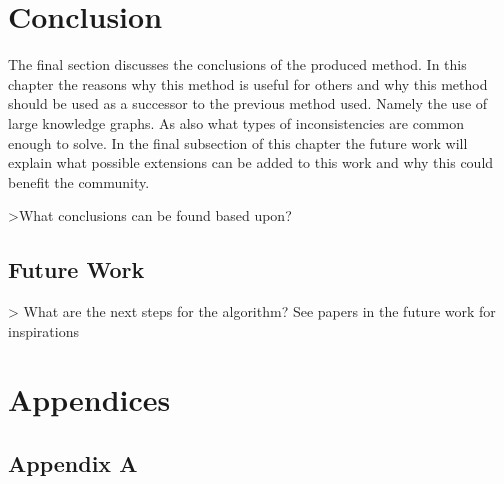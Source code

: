 \documentclass{article}
\begin{document}

\newpage
\section{Conclusion}
The final section discusses the conclusions of the produced method. In this chapter the reasons why this method is useful for others and why this method should be used as a successor to the previous method used. Namely the use of large knowledge graphs. As also what types of inconsistencies are common enough to solve. In the final subsection of this chapter the future work will explain what possible extensions can be added to this work and why this could benefit the community.

>What conclusions can be found based upon?

\subsection{Future Work}
> What are the next steps for the algorithm?
See papers in the future work for inspirations

\newpage



\newpage
\section{Appendices}
\subsection{Appendix A}
\end{document}
